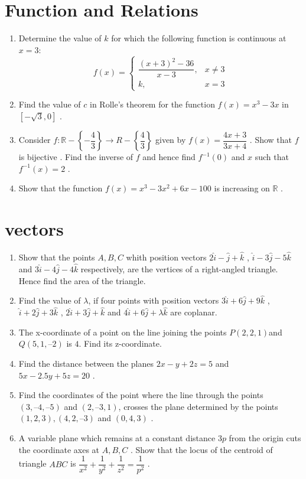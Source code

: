 \documentclass{article}
\providecommand{\brak}[1]{\ensuremath{\left(#1\right)}}
\providecommand{\sbrak}[1]{\ensuremath{\left[#1\right]}}
\begin{document}
\section{Function and Relations}
\begin{enumerate}
\item Determine the value of $k$ for which the following function is continuous at $x=3$: 
\[f(x) = \left\{
        \begin{array}{lr}
        \dfrac{(x+3)^2-36}{x-3}, & x\neq3\\
                         k     , & x=3
        \end{array}
         \right .\]
\item Find the value of $c$ in Rolle's theorem for the function $f\brak{x}=x^3-3x$ in $\sbrak{-\sqrt{3}, 0}$ .
\item Consider $f: \mathbb{R} -\left\{-\dfrac{4}{3}\right\}   \rightarrow R - \left\{\dfrac{4}{3}\right\}$ given by $f\brak{x} = \dfrac{4x + 3}{3x + 4}$ . Show that $f$ is bijective . Find the inverse of $f$ and hence find $f^{-1}\brak{0}$ and $x$ such that $f^{-1}\brak{x} = 2$ .

 \item Show that the function $f\brak{x} = x^3-3x^2+6x-100$ is increasing on $\mathbb{R}$ .
 
\end{enumerate}
\section{vectors}
\begin{enumerate}
\item Show that the points $A, B, C$ whith position vectors
$2\hat{i} - \hat{j} + \hat{k}$ ,
$\hat{i} - 3\hat{j} - 5\hat{k}$ and
$ 3\hat{i} - 4\hat{j} - 4\hat{k}$ respectively, are the vertices of a right-angled triangle. Hence find the area of the triangle.
\item Find the value of $\lambda$, if four points with position vectors 
$ 3\hat{i} + 6\hat{j} + 9\hat{k}$ ,
$ \hat{i} + 2\hat{j} + 3\hat{k}$ ,
$ 2\hat{i} + 3\hat{j} + \hat{k}$  and
$ 4\hat{i} + 6\hat{j} + \lambda\hat{k}$ are coplanar.
\item The x-coordinate of a point on the line joining the     points $P\brak{2, 2, 1}$and $Q\brak{5, 1,–2}$  is $4$. Find its z-coordinate.
\item Find the distance between the planes $2x - y + 2z = 5$ and $5x - 2.5y + 5z = 20$ .
\item Find the coordinates of the point where the line through the points $\brak{3, – 4, – 5}$ and $\brak{2, – 3, 1}$, crosses the plane determined by the points $\brak{1, 2, 3}, \brak{4, 2, – 3}$ and $\brak{0, 4, 3}$ .
\item A variable plane which remains at a constant distance $3p$ from the origin cuts the coordinate axes at $A, B, C$ . Show that the locus of the centroid of triangle $ABC$ is $\dfrac{1}{x^2} + \dfrac{1}{y^2} + \dfrac{1}{z^2} = \dfrac{1}{p^2}$ .
\end{enumerate}
\end{document}
